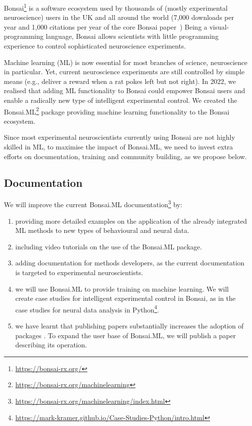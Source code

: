 Bonsai\footnote[1]{\url{https://bonsai-rx.org/}} is a software ecosystem used by thousands
of (mostly experimental neuroscience) users in the UK and all around the world
(7,000 downloads per year and 1,000 citations per year of the core Bonsai
paper~\citep{lopesEtAl15})
%
Being a visual-programming language, Bonsai allows scientists with little
programming experience to control sophisticated neuroscience experiments.

Machine learning (ML) is now essential for most branches of science,
neuroscience in particular.
%
Yet, current neuroscience experiments are still controlled by simple means
(e.g., deliver a reward when a rat pokes left but not right).
%
In 2022, we realised that adding ML functionality to Bonsai could empower
Bonsai users and enable a radically new type of intelligent experimental
control.
%
We created the
Bonsai.ML\footnote[2]{\url{https://bonsai-rx.org/machinelearning}}
package providing machine learning functionality to the Bonsai ecosystem.

Since most experimental neuroscientists currently using Bonsai are not highly
skilled in ML, to maximise the impact of Bonsai.ML, we need to invest extra
efforts on documentation, training and community building, as we propose below.

\subsection*{Documentation}

We will improve the current Bonsai.ML
documentation\footnote[3]{\url{https://bonsai-rx.org/machinelearning/index.html}}
by:

\begin{enumerate}

    \item providing more detailed examples on the application of the
        already integrated ML methods to new types of behavioural and
        neural data.

    \item including video tutorials on the use of the Bonsai.ML
        package.

    \item adding documentation for methods developers, as the current
        documentation is targeted to experimental neuroscientists.

    \item we will use Bonsai.ML to provide training on machine learning. We
        will create case studies for intelligent experimental control in
        Bonsai, as in the case studies for neural data analysis in
        Python\footnote[4]{\url{https://mark-kramer.github.io/Case-Studies-Python/intro.html}}.

    \item we have learnt that publishing papers substantially increases the
        adoption of packages \citep{lopesEtAl15,guilbeaultEtAl21}. To expand
        the user base of Bonsai.ML, we will publish a paper describing its
        operation.

\end{enumerate}

